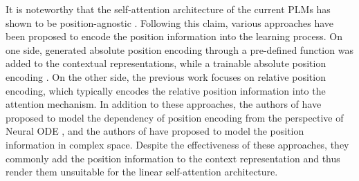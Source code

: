 \documentclass{article}
\begin{document}
It is noteworthy that the self-attention architecture of the current PLMs has shown to be position-agnostic \cite{Yun2020Are}. Following this claim, various approaches have been proposed to encode the position information into the learning process. On one side, generated absolute position encoding through a pre-defined function \cite{Vaswani:2017} was added to the contextual representations, while a trainable absolute position encoding \cite{Gehring:2017,Devlin2019BERTPO,Lan2020ALBERT:2020,clark2020electra,Radford2019LanguageMA,Radford2018ImprovingLU:2018}. On the other side, the previous work \cite{Parikh2016ADA,Shaw2018SelfAttentionWR,Huang2018MusicT,Dai2019TransformerXLAL,Yang2019XLNetGA,Raffel2020ExploringTL,Ke2020RethinkingPE,He2020DeBERTaDB,huang-etal-2020-improve} focuses on relative position encoding, which typically encodes the relative position information into the attention mechanism. In addition to these approaches, the authors of \cite{LiuYDH:2020} have proposed to model the dependency of position encoding from the perspective of Neural ODE \cite{ChenRBD:2018}, and the authors of \cite{Wang2020Encoding} have proposed to model the position information in complex space. Despite the effectiveness of these approaches, they commonly add the position information to the context representation and thus render them unsuitable for the linear self-attention architecture.

\end{document}
